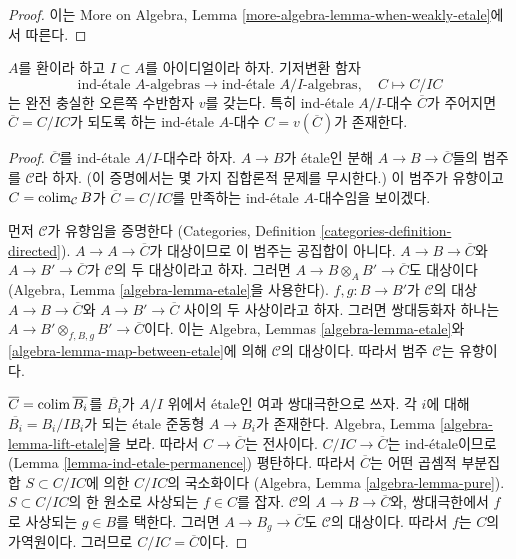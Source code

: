 \begin{proof}
이는 More on Algebra, Lemma
\ref{more-algebra-lemma-when-weakly-etale}에서 따른다.
\end{proof}

\begin{lemma}
\label{lemma-lift-ind-etale}
$A$를 환이라 하고 $I \subset A$를 아이디얼이라 하자. 기저변환 함자
$$
\text{ind-\'etale }A\text{-algebras}
\longrightarrow
\text{ind-\'etale }A/I\text{-algebras},\quad
C \longmapsto C/IC
$$
는 완전 충실한 오른쪽 수반함자 $v$를 갖는다. 특히 ind-\'etale
$A/I$-대수 $\overline{C}$가 주어지면
$\overline{C} = C/IC$가 되도록 하는 ind-\'etale $A$-대수
$C = v(\overline{C})$가 존재한다.
\end{lemma}

\begin{proof}
$\overline{C}$를 ind-\'etale $A/I$-대수라 하자.
$A \to B$가 \'etale인 분해 $A \to B \to \overline{C}$들의 범주를
$\mathcal{C}$라 하자. (이 증명에서는 몇 가지 집합론적 문제를 무시한다.)
이 범주가 유향이고 $C = \mathop{\mathrm{colim}}\nolimits_\mathcal{C} B$가
$\overline{C} = C/IC$를 만족하는 ind-\'etale $A$-대수임을 보이겠다.

\medskip\noindent
먼저 $\mathcal{C}$가 유향임을 증명한다
(Categories, Definition \ref{categories-definition-directed}).
$A \to A \to \overline{C}$가 대상이므로 이 범주는 공집합이 아니다.
$A \to B \to \overline{C}$와 $A \to B' \to \overline{C}$가
$\mathcal{C}$의 두 대상이라고 하자. 그러면
$A \to B \otimes_A B' \to \overline{C}$도 대상이다
(Algebra, Lemma \ref{algebra-lemma-etale}을 사용한다).
$f, g : B \to B'$가 $\mathcal{C}$의 대상
$A \to B \to \overline{C}$와 $A \to B' \to \overline{C}$ 사이의
두 사상이라고 하자. 그러면 쌍대등화자 하나는
$A \to B' \otimes_{f, B, g} B' \to \overline{C}$이다.
이는 Algebra, Lemmas \ref{algebra-lemma-etale}와
\ref{algebra-lemma-map-between-etale}에 의해 $\mathcal{C}$의 대상이다.
따라서 범주 $\mathcal{C}$는 유향이다.

\medskip\noindent
$\overline{C} = \mathop{\mathrm{colim}}\nolimits \overline{B_i}$를 $\overline{B_i}$가
$A/I$ 위에서 \'etale인 여과 쌍대극한으로 쓰자.
각 $i$에 대해 $\overline{B_i} = B_i/IB_i$가 되는 \'etale 준동형
$A \to B_i$가 존재한다. Algebra, Lemma
\ref{algebra-lemma-lift-etale}을 보라. 따라서
$C \to \overline{C}$는 전사이다.
$C/IC \to \overline{C}$는 ind-\'etale이므로
(Lemma \ref{lemma-ind-etale-permanence}) 평탄하다.
따라서 $\overline{C}$는 어떤 곱셈적 부분집합
$S \subset C/IC$에 의한 $C/IC$의 국소화이다
(Algebra, Lemma \ref{algebra-lemma-pure}).
$S \subset C/IC$의 한 원소로 사상되는 $f \in C$를 잡자.
$\mathcal{C}$의 $A \to B \to \overline{C}$와, 쌍대극한에서
$f$로 사상되는 $g \in B$를 택한다. 그러면
$A \to B_g \to \overline{C}$도 $\mathcal{C}$의 대상이다.
따라서 $f$는 $C$의 가역원이다. 그러므로
$C/IC = \overline{C}$이다.


\end{proof}
